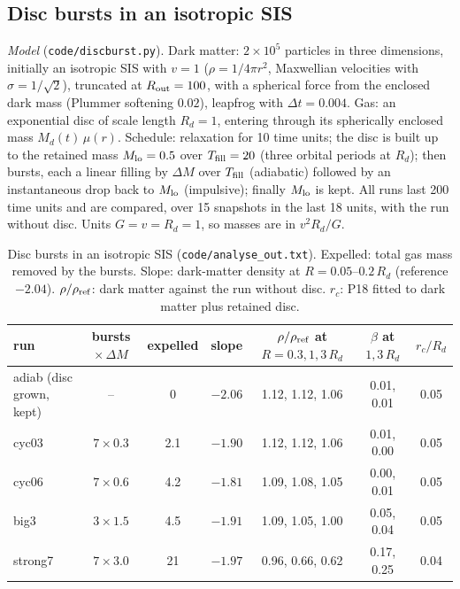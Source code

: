 \documentclass[11pt,a4paper]{article}
\theoremstyle{definition}
\theoremstyle{remark}
\newcommand{\Rd}{R_d}
\begin{document}
\subsection{Disc bursts in an isotropic SIS}\label{sec:discruns}

\emph{Model} (\texttt{code/discburst.py}). Dark matter: $2\times10^5$ particles in three
dimensions, initially an isotropic SIS with $v=1$ ($\rho=1/4\pi r^2$, Maxwellian velocities with
$\sigma=1/\sqrt2$), truncated at $R_{\rm out}=100$, with a spherical force from the enclosed
dark mass (Plummer softening $0.02$), leapfrog with $\Delta t=0.004$. Gas: an exponential disc
of scale length $\Rd=1$, entering through its spherically enclosed mass $M_d(t)\,\mu(r)$.
Schedule: relaxation for 10 time units; the disc is built up to the retained mass $M_{\rm lo}=0.5$
over $T_{\rm fill}=20$ (three orbital periods at $\Rd$); then bursts, each a linear filling by
$\Delta M$ over $T_{\rm fill}$ (adiabatic) followed by an instantaneous drop back to
$M_{\rm lo}$ (impulsive); finally $M_{\rm lo}$ is kept. All runs last 200 time units and are
compared, over 15 snapshots in the last 18 units, with the run without disc. Units
$G=v=\Rd=1$, so masses are in $v^2\Rd/G$.

\begin{table}[h]
\centering\small
\setlength\tabcolsep{4pt}
\caption{Disc bursts in an isotropic SIS (\texttt{code/analyse\_out.txt}). Expelled: total gas mass
removed by the bursts. Slope: dark-matter density at $R=0.05$--$0.2\,\Rd$ (reference $-2.04$).
$\rho/\rho_{\rm ref}$: dark matter against the run without disc. $r_c$: P18 fitted to dark matter
plus retained disc.}
\label{tab:discruns}
\begin{tabular}{lcccccc}
\toprule
run & bursts $\times\,\Delta M$ & expelled & slope & $\rho/\rho_{\rm ref}$ at $R=0.3,1,3\,\Rd$ & $\beta$ at $1,3\,\Rd$ & $r_c/\Rd$\\
\midrule
adiab (disc grown, kept) & -- & 0 & $-2.06$ & 1.12, 1.12, 1.06 & 0.01, 0.01 & 0.05\\
cyc03 & $7\times0.3$ & 2.1 & $-1.90$ & 1.12, 1.12, 1.06 & 0.01, 0.00 & 0.05\\
cyc06 & $7\times0.6$ & 4.2 & $-1.81$ & 1.09, 1.08, 1.05 & 0.00, 0.01 & 0.05\\
big3 & $3\times1.5$ & 4.5 & $-1.91$ & 1.09, 1.05, 1.00 & 0.05, 0.04 & 0.05\\
strong7 & $7\times3.0$ & 21 & $-1.97$ & 0.96, 0.66, 0.62 & 0.17, 0.25 & 0.04\\
\bottomrule
\end{tabular}
\end{table}
\end{document}
